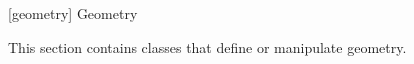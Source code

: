 
 [geometry] {Geometry}

\pnum
This section contains classes that define or manipulate geometry.

\addtocounter{SectionDepthBase}{1}





\addtocounter{SectionDepthBase}{-1}

